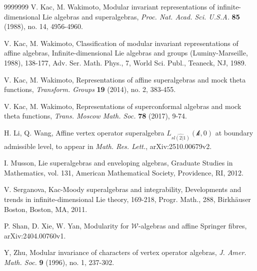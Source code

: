 \documentclass[12pt]{article}
\begin{document}
\begin{thebibliography}{9999999}
V. Kac, M. Wakimoto,
Modular invariant representations of infinite-dimensional Lie algebras and superalgebras,
{\em Proc. Nat. Acad. Sci. U.S.A.} {\bf 85} (1988), no. 14, 4956-4960.

V. Kac, M. Wakimoto,
Classification of modular invariant representations of affine algebras,
Infinite-dimensional Lie algebras and groups (Luminy-Marseille, 1988), 138-177,
Adv. Ser. Math. Phys., 7, World Sci. Publ., Teaneck, NJ, 1989.

V. Kac, M. Wakimoto,
Representations of affine superalgebras and mock theta functions,
{\em Transform. Groups} {\bf 19} (2014), no. 2, 383-455.

V. Kac, M. Wakimoto,
Representations of superconformal algebras and mock theta functions,
{\em Trans. Moscow Math. Soc.} {\bf 78} (2017), 9-74.


H. Li, Q. Wang,
Affine vertex operator superalgebra $L_{\widehat{sl(2|1)}}(\mathcal{k},0)$ at boundary admissible level,
to appear in {\em Math. Res. Lett.}, arXiv:2510.00679v2.

I. Musson,
Lie superalgebras and enveloping algebras,
Graduate Studies in Mathematics, vol. 131, American Mathematical Society, Providence, RI, 2012.

V. Serganova,
Kac-Moody superalgebras and integrability,
Developments and trends in infinite-dimensional Lie theory, 169-218,
Progr. Math., 288, Birkh\"{a}user Boston, Boston, MA, 2011.

P. Shan, D. Xie, W. Yan,
Modularity for $\mathcal{W}$-algebras and affine Springer fibres,
arXiv:2404.00760v1.

Y, Zhu,
Modular invariance of characters of vertex operator algebras,
{\em J. Amer. Math. Soc.} {\bf 9} (1996), no. 1, 237-302.
\end{thebibliography}
\end{document}
